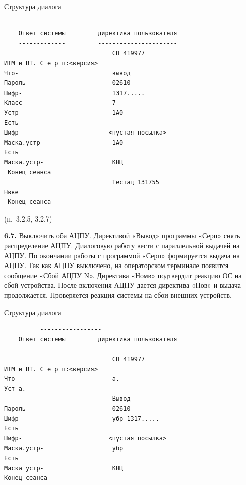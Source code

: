 \documentclass[11pt,a4paper]{article}
\begin{document}
\begin{center}Структура диалога\end{center}
\begin{center}\small
\begin{BVerbatim}
          -----------------
    Ответ системы         директива пользователя
    -------------         ----------------------
                              СП 419977
ИТМ и ВТ. С е р п:<версия>
Что-                          вывод
Пароль-                       02610
Шифр-                         1317.....
Класс-                        7
Устр-                         1А0
Есть
Шифр-                        <пустая посылка>
Маска.устр-                   1А0
Есть
Маска.устр-                   КНЦ
 Конец сеанса
                              Тестац 131755
Нвве
 Конец сеанса
\end{BVerbatim}
\end{center}

\begin{center}(п.~3.2.5, 3.2.7)\end{center}
\par\textbf{6.7.} Выключить оба АЦПУ. Директивой «Вывод» программы «Серп» снять распределение АЦПУ. Диалоговую работу вести с параллельной выдачей на АЦПУ. По окончании работы с программой «Серп» формируется выдача на АЦПУ. Так как АЦПУ выключено, на операторском терминале появится сообщение «Сбой АЦПУ N». Директива «Номв» подтвердит реакцию ОС на сбой устройства. После включения АЦПУ дается директива «Пов» и выдача продолжается. Проверяется реакция системы на сбои внешних устройств.\par
\begin{center}Структура диалога\end{center}
\begin{center}\small
\begin{BVerbatim}
          -----------------
    Ответ системы         директива пользователя
    -------------         ----------------------
                              СП 419977
ИТМ и ВТ. С е р п:<версия>
Что-                          а.
Уст а.
-                             Вывод
Пароль-                       02610
Шифр-                         убр 1317.....
Есть
Шифр-                        <пустая посылка>
Маска.устр-                   убр
Есть
Маска устр-                   КНЦ
Конец сеанса
\end{BVerbatim}
\end{center}
\end{document}

